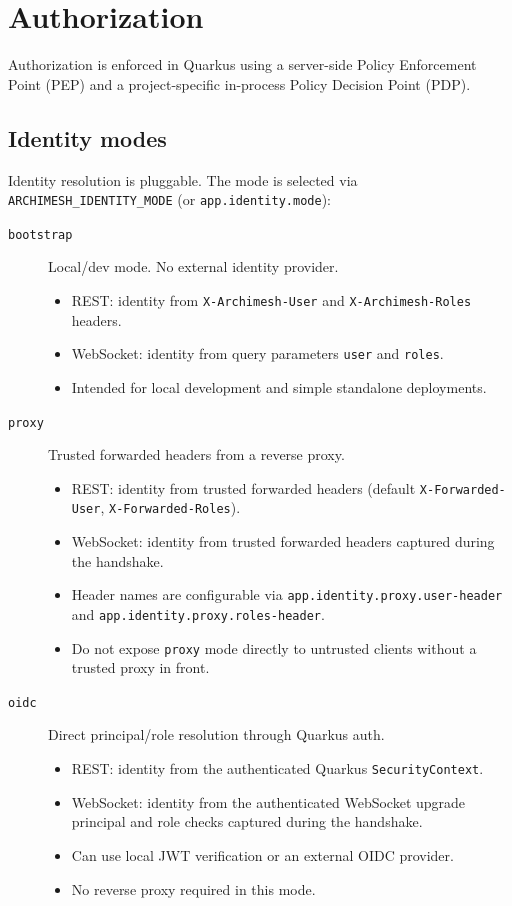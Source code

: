 \section{Authorization}
\label{sec:Authorization}

Authorization is enforced in Quarkus using a server-side Policy Enforcement
Point (PEP) and a project-specific in-process Policy Decision Point (PDP).

\subsection{Identity modes}

Identity resolution is pluggable. The mode is selected via
\texttt{ARCHIMESH\_IDENTITY\_MODE} (or \texttt{app.identity.mode}):

\begin{description}
\item[\texttt{bootstrap}] Local/dev mode. No external identity provider.
  \begin{itemize}
  \item REST: identity from \texttt{X-Archimesh-User} and
    \texttt{X-Archimesh-Roles} headers.
  \item WebSocket: identity from query parameters \texttt{user} and
    \texttt{roles}.
  \item Intended for local development and simple standalone deployments.
  \end{itemize}

\item[\texttt{proxy}] Trusted forwarded headers from a reverse proxy.
  \begin{itemize}
  \item REST: identity from trusted forwarded headers (default
    \texttt{X-Forwarded-User}, \texttt{X-Forwarded-Roles}).
  \item WebSocket: identity from trusted forwarded headers captured during
    the handshake.
  \item Header names are configurable via
    \texttt{app.identity.proxy.user-header} and
    \texttt{app.identity.proxy.roles-header}.
  \item Do not expose \texttt{proxy} mode directly to untrusted clients
    without a trusted proxy in front.
  \end{itemize}

\item[\texttt{oidc}] Direct principal/role resolution through Quarkus auth.
  \begin{itemize}
  \item REST: identity from the authenticated Quarkus
    \texttt{SecurityContext}.
  \item WebSocket: identity from the authenticated WebSocket upgrade
    principal and role checks captured during the handshake.
  \item Can use local JWT verification or an external OIDC provider.
  \item No reverse proxy required in this mode.
  \end{itemize}
\end{description}

